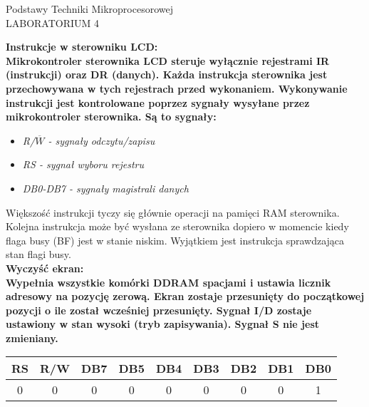 \documentclass[a4paper,12pt]{article}
\newcommand{\h}[1]{\noindent \bf #1 \rm \\ \noindent}
\newcommand{\italic}[1]{\it #1 \rm}
\begin{document}
\begin{center}
	\LARGE
	Podstawy Techniki Mikroprocesorowej \\
	\large
	LABORATORIUM 4 
\end{center}
\vspace{1cm}

\h{Instrukcje w sterowniku LCD:}
Mikrokontroler sterownika LCD steruje wyłącznie rejestrami IR (instrukcji) oraz DR (danych). Każda instrukcja sterownika jest przechowywana w tych rejestrach przed wykonaniem. Wykonywanie instrukcji jest kontrolowane poprzez sygnały wysyłane przez mikrokontroler sterownika. Są to sygnały:
\begin{itemize}
	\item \italic{R/$\overline{W}$} - sygnały odczytu/zapisu
	\item \italic{RS} - sygnał wyboru rejestru
	\item \italic{DB0-DB7} - sygnały magistrali danych
\end{itemize}
\vspace{5mm}

\noindent
Większość instrukcji tyczy się głównie operacji na pamięci RAM sterownika. Kolejna instrukcja może być wysłana ze sterownika dopiero w momencie kiedy flaga busy (BF) jest w stanie niskim. Wyjątkiem jest instrukcja sprawdzająca stan flagi busy.\\

\h{Wyczyść ekran:}
Wypełnia wszystkie komórki DDRAM spacjami i ustawia licznik adresowy na pozycję zerową. Ekran zostaje przesunięty do początkowej pozycji o ile został wcześniej przesunięty. Sygnał I/D zostaje ustawiony w stan wysoki (tryb zapisywania). Sygnał S nie jest zmieniany.
\begin{table}[H]
	\centering
	\begin{tabular}{|c|c|c|c|c|c|c|c|c|}
		\hline
		\multicolumn{1}{|c|}{\textbf{RS}} & \multicolumn{1}{c|}{\textbf{R/W}} & \multicolumn{1}{c|}{\textbf{DB7}} & \multicolumn{1}{c|}{\textbf{DB5}} & \multicolumn{1}{c|}{\textbf{DB4}} & \multicolumn{1}{c|}{\textbf{DB3}} & \multicolumn{1}{c|}{\textbf{DB2}} & \multicolumn{1}{c|}{\textbf{DB1}} & \multicolumn{1}{c|}{\textbf{DB0}} \\ \hline
		0                                 & 0                                 & 0                                 & 0                                 & 0                                 & 0                                 & 0                                 & 0                                 & 1                                 \\ \hline
	\end{tabular}
\end{table}
\end{document}
